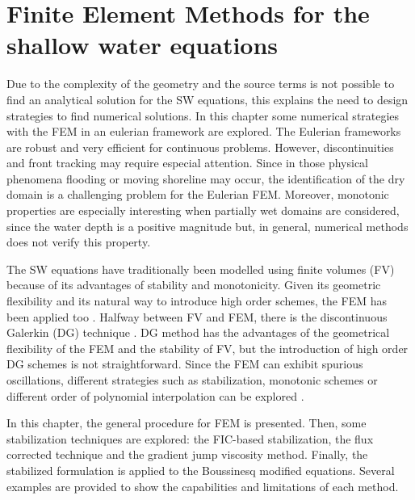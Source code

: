 
\chapter{Finite Element Methods for the shallow water equations}
\label{eulerian_sw}


Due to the complexity of the geometry and the source terms is not possible to find an analytical solution for the SW equations, this explains the need to design strategies to find numerical solutions. In this chapter some numerical strategies with the FEM in an eulerian framework are explored.
The Eulerian frameworks are robust and very efficient for continuous problems. However, discontinuities and front tracking may require especial attention. Since in those physical phenomena flooding or moving shoreline may occur, the identification of the dry domain is a challenging problem for the Eulerian FEM.
Moreover, monotonic properties are especially interesting when partially wet domains are considered, since the water depth is a positive magnitude but, in general, numerical methods does not verify this property.

The SW equations have traditionally been modelled using finite volumes (FV) because of its advantages of stability and monotonicity. Given its geometric flexibility and its natural way to introduce high order schemes, the FEM has been applied too \cite{zien3,navon1979,navon1988}.
Halfway between FV and FEM, there is the discontinuous Galerkin (DG) technique \cite{ambati2007,khan2014,lee2019}. DG method has the advantages of the geometrical flexibility of the FEM and the stability of FV, but the introduction of high order DG schemes is not straightforward.
Since the FEM can exhibit spurious oscillations, different strategies such as stabilization, monotonic schemes or different order of polynomial interpolation can be explored \cite{hood1974,zien3,ortiz2012}.





In this chapter, the general procedure for FEM is presented. Then, some stabilization techniques are explored: the FIC-based stabilization, the flux corrected technique and the gradient jump viscosity method. Finally, the stabilized formulation is applied to the Boussinesq modified equations. Several examples are provided to show the capabilities and limitations of each method.





